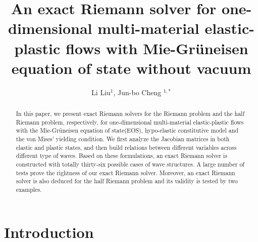 \documentclass{article}
\numberwithin{equation}{section}
\numberwithin{table}{section}
\begin{document}
\title{An exact Riemann solver for one-dimensional multi-material elastic-plastic flows with Mie-Gr\"uneisen equation of state without vacuum}
\author{Li Liu$^1$, Jun-bo Cheng $^{1,*}$}

\maketitle


\begin{abstract}

  In this paper, we present exact Riemann solvers for the Riemann problem and the half Riemann problem, respectively,  for one-dimensional multi-material elastic-plastic flows with the Mie-Gr\"uneisen equation of state(EOS), hypo-elastic constitutive model and  the von Mises' yielding condition. We first  analyze the Jacobian matrices in  both elastic and plastic states, and then build relations between different variables across different type of waves. Based on these formulations, an exact Riemann solver is constructed with totally thirty-six possible cases of wave structures. 
  A large number of tests prove the rightness of our exact Riemann solver. Moreover, an exact Riemann solver is also deduced for the half Riemann problem and  its validity is tested  by two examples.
\end{abstract}



\section{Introduction}
\end{document}
